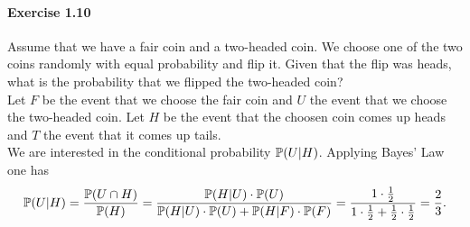 \paragraph{Exercise 1.10} Assume that we have a fair coin and a two-headed coin.
We choose one of the two coins randomly with equal probability and flip it. Given
that the flip was heads, what is the probability that we flipped the two-headed coin? \\
Let $F$ be the event that we choose the fair coin and $U$ the event that we choose
the two-headed coin. Let $H$ be the event that the choosen coin comes up heads
and $T$ the event that it comes up tails. \\
We are interested in the conditional probability $\mathbb{P}(U|H)$. Applying Bayes' Law
one has
\[ \mathbb{P}(U|H)
    = \frac{\mathbb{P}(U \cap H)}{\mathbb{P}(H)}
    =\frac{\mathbb{P}(H|U) \cdot \mathbb{P}(U)}{\mathbb{P}(H|U) \cdot \mathbb{P}(U) + \mathbb{P}(H|F) \cdot \mathbb{P}(F)}
    =\frac{1 \cdot \frac{1}{2}}{1 \cdot \frac{1}{2} + \frac{1}{2} \cdot \frac{1}{2}}
    = \frac{2}{3}.
\]
